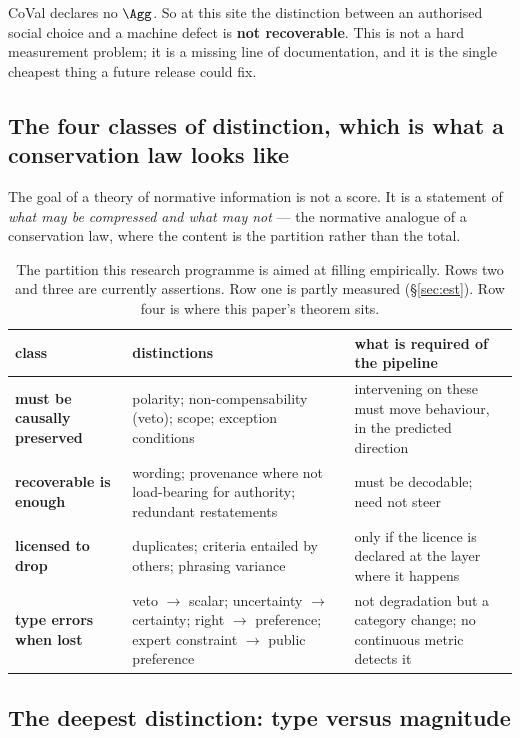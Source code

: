  CoVal declares no $\Agg$. So at this site the
distinction between an authorised social choice and a machine defect is
\textbf{not recoverable}. This is not a hard measurement problem; it is a missing
line of documentation, and it is the single cheapest thing a future release could
fix.

\subsection{The four classes of distinction, which is what a conservation law looks like}

The goal of a theory of normative information is not a score. It is a statement
of \emph{what may be compressed and what may not} --- the normative analogue of a
conservation law, where the content is the partition rather than the total.

\begin{table}[H]\centering\small
\begin{tabularx}{\textwidth}{P{3.4cm}P{5.2cm}Y}
\toprule
class & distinctions & what is required of the pipeline\\
\midrule
\textbf{must be causally preserved} & polarity; non-compensability (veto); scope;
exception conditions & intervening on these must move behaviour, in the predicted
direction\\
\textbf{recoverable is enough} & wording; provenance where not load-bearing for
authority; redundant restatements & must be decodable; need not steer\\
\textbf{licensed to drop} & duplicates; criteria entailed by others; phrasing
variance & only if the licence is declared at the layer where it happens\\
\textbf{type errors when lost} & veto $\to$ scalar; uncertainty $\to$ certainty;
right $\to$ preference; expert constraint $\to$ public preference & not
degradation but a category change; no continuous metric detects it\\
\bottomrule
\end{tabularx}
\caption{The partition this research programme is aimed at filling empirically.
Rows two and three are currently assertions. Row one is partly measured
(§\ref{sec:est}). Row four is where this paper's theorem sits.}
\label{tab:conservation}
\end{table}

\subsection{The deepest distinction: type versus magnitude}

